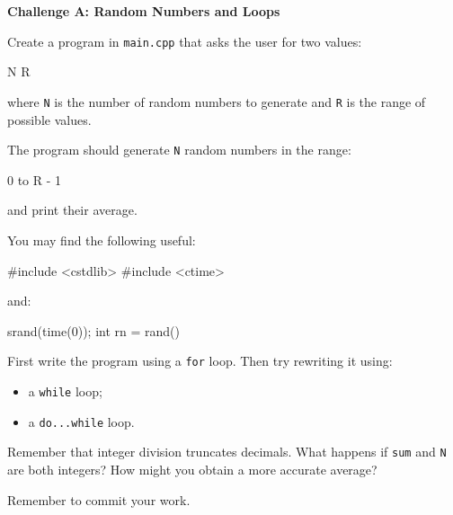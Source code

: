 \documentclass{csc2059practical}
\begin{document}
\begin{challengebox}
\textbf{Challenge A: Random Numbers and Loops}

Create a program in \texttt{main.cpp} that asks the user for two values:

\begin{terminal}
N R
\end{terminal}

where \texttt{N} is the number of random numbers to generate and \texttt{R} is the range of possible values.

The program should generate \texttt{N} random numbers in the range:

\begin{terminal}
0 to R - 1
\end{terminal}

and print their average.

You may find the following useful:

\begin{cppcode}
#include <cstdlib>
#include <ctime>
\end{cppcode}

and:

\begin{cppcode}
srand(time(0));
int rn = rand() %
\end{cppcode}

First write the program using a \texttt{for} loop. Then try rewriting it using:

\begin{itemize}
  \item a \texttt{while} loop;
  \item a \texttt{do...while} loop.
\end{itemize}

Remember that integer division truncates decimals. What happens if \texttt{sum} and \texttt{N} are both integers? How might you obtain a more accurate average?

Remember to commit your work.
\end{challengebox}
\end{document}
